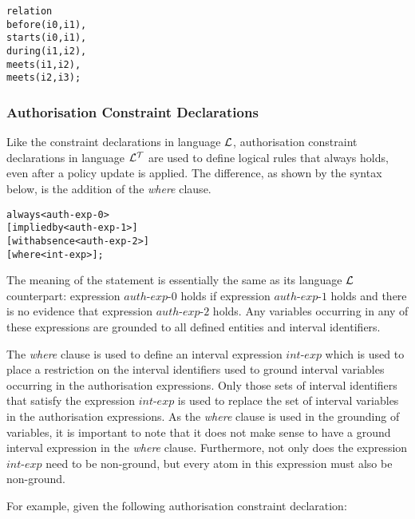\documentclass[11pt]{report}
\newenvironment{vverbatim}
{
  \begin{alltt}
}
{
    \vspace{-\baselineskip}
  \end{alltt}
}
\begin{document}
          \begin{vverbatim}
  relation
    before(i0, i1),
    starts(i0, i1),
    during(i1, i2),
    meets(i1, i2),
    meets(i2, i3);
          \end{vverbatim}

        \subsubsection{Authorisation Constraint Declarations}

          Like the constraint declarations in language ${\cal L}$,
          authorisation constraint declarations in language ${\cal L^T}$ are
          used to define logical rules that always holds, even after a policy
          update is applied. The difference, as shown by the syntax below, is
          the addition of the {\em where} clause.

          \begin{vverbatim}
  always <auth-exp-0>
    [implied by <auth-exp-1>]
    [with absence <auth-exp-2>]
    [where <int-exp>];
          \end{vverbatim}

          The meaning of the statement is essentially the same as its language
          ${\cal L}$ counterpart: expression $auth$-$exp$-$0$ holds if
          expression $auth$-$exp$-$1$ holds and there is no evidence that
          expression $auth$-$exp$-$2$ holds. Any variables occurring in
          any of these expressions are grounded to all defined entities and
          interval identifiers.

          The {\em where} clause is used to define an interval expression
          $int$-$exp$ which is used to place a restriction on the interval
          identifiers used to ground interval variables occurring in the
          authorisation expressions. Only those sets of interval identifiers
          that satisfy the expression $int$-$exp$ is used to replace the
          set of interval variables in the authorisation expressions. As the
          {\em where} clause is used in the grounding of variables, it is
          important to note that it does not make sense to have a ground
          interval expression in the {\em where} clause. Furthermore, not only
          does the expression $int$-$exp$ need to be non-ground, but every atom
          in this expression must also be non-ground.

          For example, given the following authorisation constraint
          declaration:
\end{document}
